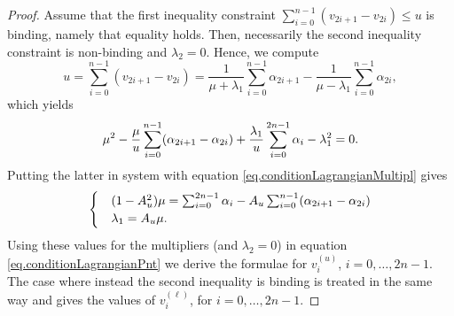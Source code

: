 \documentclass[10pt, article,table]{article}
\begin{document}
\begin{proof}
Assume that the first inequality constraint 
   $\sum_{i=0}^{n-1}(v_{2i+1}-v_{2i}) \leq u$
is binding, namely that equality holds. Then, necessarily the second inequality constraint is non-binding and $\lambda_2=0$. Hence, we compute
\begin{equation*}
 u=\sum_{i=0}^{n-1}(v_{2i+1}-v_{2i})
 =
 \frac{1}{\mu+\lambda_1}\sum_{i=0}^{n-1}\alpha_{2i+1}
 -\frac{1}{\mu-\lambda_1}\sum_{i=0}^{n-1}\alpha_{2i},
\end{equation*}
which yields
\begin{equation*}
 \mu\squared - \frac{\mu}{u}\sum_{i=0}^{n-1}(\alpha_{2i+1}-\alpha_{2i})
 +\frac{\lambda_1}{u}\sum_{i=0}^{2n-1}\alpha_i - \lambda_{1}\squared=0.
\end{equation*}
Putting the latter in system with equation \eqref{eq.conditionLagrangianMultipl} gives
\begin{equation*}
 \begin{cases}
  &
  (1-A_{u}\squared)\mu=\sum_{i=0}^{2n-1}\alpha_i - A_{u}\sum_{i=0}^{n-1}(\alpha_{2i+1}-\alpha_{2i})
  \\
  &
  \lambda_1 = A_u \mu.
 \end{cases}
\end{equation*}
Using these values for the multipliers (and $\lambda_2=0$) in equation \eqref{eq.conditionLagrangianPnt} we derive the formulae for $v^{(u)}_{i}$, $i=0,\dots,2n-1$. The case where instead the second inequality is binding is treated in the same way and gives the values of $v^{(\ell)}_{i}$, for $i=0,\dots,2n-1$.
\end{proof}
\end{document}
